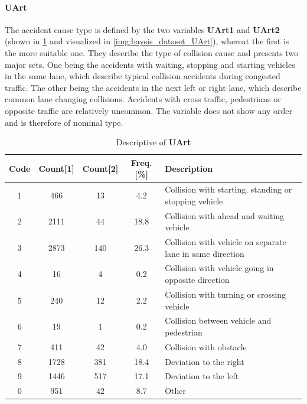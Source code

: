 \paragraph{UArt}
\label{baysis_dataset_UArt}
The accident cause type is defined by the two variables \textbf{UArt1} and \textbf{UArt2} (shown in \cref{tbl:baysis_dataset_UArt} and visualized in \cref{img:baysis_dataset_UArt}), whereat the first is the more suitable one. They describe the type of collision cause and presents two major sets. One being the accidents with waiting, stopping and starting vehicles in the same lane, which describe typical collision accidents during congested traffic. The other being the accidents in the next left or right lane, which describe common lane changing collisions. Accidents with cross traffic, pedestrians or opposite traffic are relatively uncommon. The variable does not show any order and is therefore of nominal type.
\begin{table}[ht]
	\centering
	\small
	\begin{tabular}{c|c|c|c|l} 
		\toprule
		Code & Count[1] & Count[2] & Freq. [\%] & Description \\ 
		\midrule
 		1 & 466		& 13	& 4.2  & Collision with starting, standing or stopping vehicle  \\ 
 		2 & 2111	& 44 	& 18.8 & Collision with ahead and waiting vehicle  \\
 		3 & 2873	& 140	& 26.3 & Collision with vehicle on separate lane in same direction  \\
 		4 &	16		& 4		& 0.2   & Collision with vehicle going in opposite direction  \\
 		5 & 240		& 12	& 2.2  & Collision with turning or crossing vehicle  \\
 		6 & 19		& 1		& 0.2   & Collision between vehicle and pedestrian  \\
 		7 & 411		& 42	& 4.0  & Collision with obstacle  \\
 		8 & 1728	& 381	& 18.4 & Deviation to the right  \\
 		9 & 1446	& 517	& 17.1 & Deviation to the left  \\
		0 & 951		& 42	& 8.7  & Other  \\
		\bottomrule
	\end{tabular}
	\caption{Descriptive of \textbf{UArt}}
	\label{tbl:baysis_dataset_UArt}
\end{table}

